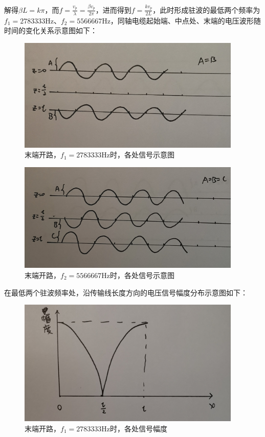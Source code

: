 \documentclass[UTF8]{ctexart}
\begin{document}
解得$\beta L=k\pi$，而$f=\frac{v_p}{\lambda}=\frac{\beta v_p}{2\pi}$，进而得到$f=\frac{kv_p}{2L}$，此时形成驻波的最低两个频率为$f_1=2783333$Hz、$f_2=5566667$Hz，同轴电缆起始端、中点处、末端的电压波形随时间的变化关系示意图如下：
\begin{figure}[H]
\centering
\includegraphics[width=0.95\textwidth]{G.jpg}
\caption{末端开路，$f_1=2783333$Hz时，各处信号示意图}
\end{figure}

\begin{figure}[H]
\centering
\includegraphics[width=0.95\textwidth]{H.jpg}
\caption{末端开路，$f_2=5566667$Hz时，各处信号示意图}
\end{figure}

在最低两个驻波频率处，沿传输线长度方向的电压信号幅度分布示意图如下：

\begin{figure}[H]
\centering
\includegraphics[width=0.95\textwidth]{K.jpg}
\caption{末端开路，$f_1=2783333$Hz时，各处信号幅度}
\end{figure}
\end{document}
